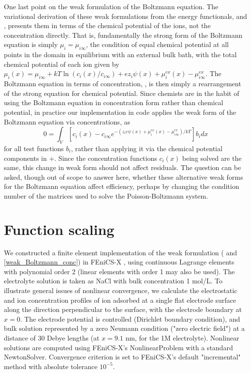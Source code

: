 One last point on the weak formulation of the Boltzmann equation. The variational
derivation of these weak formulations from the energy functionals,
 and , presents them in terms of the
chemical potential of the ions, not the concentration directly. That
is, fundamentally the strong form of the Boltzmann equation is simply $\mu_i =
\mu_{i\infty}$, the condition of equal chemical potential at all
points in the domain in equilibrium with an external bulk bath, with the total chemical potential of each ion 
given by $\mu_i(x)=\mu_{i\infty} + kT \ln(c_i(x)/c_{i\infty})
+ ez_i \psi(x) + \mu_i^{ex}(x)-\mu_{i\infty}^{ex}$.  The Boltzmann
equation in terms of 
concentration, , is then simply a rearrangement of
the strong equation for chemical potential. Since chemists are in the
habit of using the Boltzmann equation in concentration form rather
than chemical potential, in practice our implementation in code applies the weak
form of the Boltzmann equation via concentrations, as
\begin{equation}
0 =   \int_V \left[ c_i(x) - c_{i\infty}
    e^{-\left(z_i e \psi(x) +
      \mu_i^{ex}(x)-\mu_{i\infty}^{ex}\right)/kT} \right] b_i
dx 
\label{weak_Boltzmann_conc}
\end{equation}
for all test functions $b_i$, rather than applying it via the chemical
potential components in 
+. Since the concentration functions $c_i(x)$ being
solved are the same, this change in weak form should not affect
residuals. The question can be asked, though out of scope
to answer here, whether these alternative weak forms for the Boltzmann
equation affect efficiency, perhaps by changing the condition number
of the matrices used to solve the Poisson-Boltzmann system.

\section{Function scaling}
We constructed a finite element implementation of the weak
formulation ( and \eqref{weak_Boltzmann_conc}) in
FEniCS-X \cite{baratta2023dolfinx}, using continuous 
Lagrange elements with polynomial order 2 (linear elements with order
1 may also be used).  The electrolyte solution
is taken as NaCl with bulk concentration 1 mol/L.  To illustrate
general issues of nonlinear convergence, we calculate the
electrostatic and ion concentration profiles of ion adsorbed at a
single flat electrode surface along the direction perpendicular to the
surface, with the electrode boundary at $x=0$.  The electrode
potential is controlled (Dirichlet boundary condition), and bulk
solution represented by a zero Neumann condition ("zero electric
field") at a distance of 30 Debye lengths (at $x=9.1$ nm, for the 1M
electrolyte). Nonlinear solutions are computed using FEniCS-X's
NonlinearProblem with a standard NewtonSolver. Convergence criterion
is set to FEniCS-X's default "incremental" method with absolute
tolerance $10^{-5}$.

